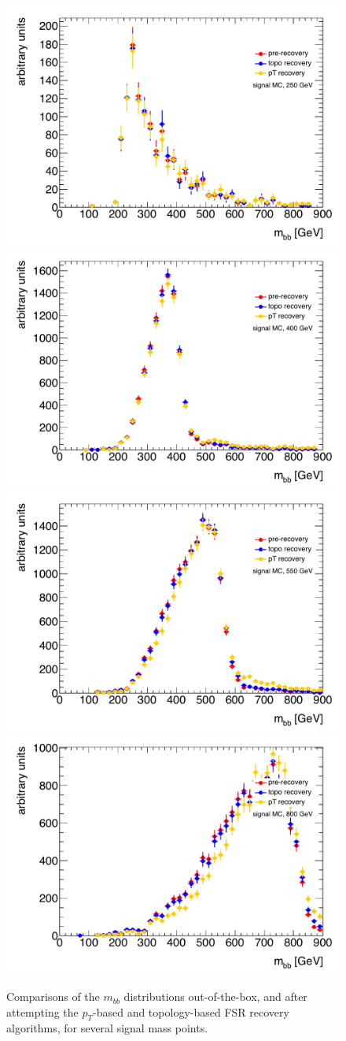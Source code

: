 \begin{figure}[hbt]
  \includegraphics[width=0.45\linewidth]{SignalKin/fsr_recovery_bAbb_250.pdf}
  \includegraphics[width=0.45\linewidth]{SignalKin/fsr_recovery_bAbb_400.pdf}
\newline
  \includegraphics[width=0.45\linewidth]{SignalKin/fsr_recovery_bAbb_550.pdf}
  \includegraphics[width=0.45\linewidth]{SignalKin/fsr_recovery_bAbb_800.pdf}
  \caption{Comparisons of the $m_{bb}$ distributions out-of-the-box, 
  and after attempting the $p_T$-based and topology-based 
  FSR recovery algorithms, for several signal mass points. \label{fig:fsr_recovery}}
\end{figure}



